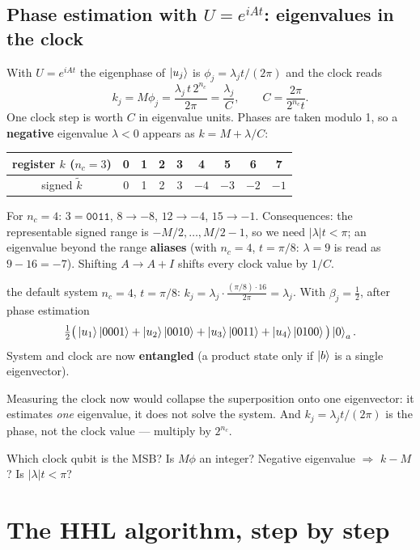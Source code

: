 \documentclass[11pt,a4paper,openany]{book}
\newcounter{wex}[chapter]
\begin{document}
\subsection{Phase estimation with $U = e^{iAt}$: eigenvalues in the clock}
With $U = e^{iAt}$ the eigenphase of $\ket{u_j}$ is $\phi_j = \lambda_jt/(2\pi)$ and the clock reads
\[ k_j = M\phi_j = \frac{\lambda_j\,t\,2^{n_c}}{2\pi} = \frac{\lambda_j}{C},\qquad C = \frac{2\pi}{2^{n_c}t}. \]
One clock step is worth $C$ in eigenvalue units. Phases are taken modulo 1, so a \textbf{negative} eigenvalue $\lambda < 0$ appears as $k = M + \lambda/C$:
\begin{center}\small
\begin{tabular}{c|cccccccc}
register $k$ ($n_c = 3$) & 0 & 1 & 2 & 3 & 4 & 5 & 6 & 7\\ \hline
signed $\tilde k$ & 0 & 1 & 2 & 3 & $-4$ & $-3$ & $-2$ & $-1$
\end{tabular}
\end{center}
For $n_c = 4$: $3 = \texttt{0011}$, $8 \to -8$, $12 \to -4$, $15 \to -1$. Consequences: the representable signed range is $-M/2, \dots, M/2 - 1$, so we need $|\lambda|t < \pi$;
an eigenvalue beyond the range \textbf{aliases} (with $n_c = 4$, $t = \pi/8$: $\lambda = 9$ is read as $9 - 16 = -7$). Shifting $A \to A + I$ shifts every clock value by $1/C$.
\begin{wexample}{the default system}
$n_c = 4$, $t = \pi/8$: $k_j = \lambda_j\cdot\frac{(\pi/8)\cdot16}{2\pi} = \lambda_j$. With $\beta_j = \frac12$, after phase estimation
\[ \tfrac12\big(\ket{u_1}\ket{0001} + \ket{u_2}\ket{0010} + \ket{u_3}\ket{0011} + \ket{u_4}\ket{0100}\big)\ket0_a. \]
System and clock are now \textbf{entangled} (a product state only if $\ket b$ is a single eigenvector).
\end{wexample}
\begin{trap}
Measuring the clock now would collapse the superposition onto one eigenvector: it estimates \emph{one} eigenvalue, it does not solve the system. And
$k_j = \lambda_jt/(2\pi)$ is the phase, not the clock value --- multiply by $2^{n_c}$.
\end{trap}
\begin{checklist}
Which clock qubit is the MSB? Is $M\phi$ an integer? Negative eigenvalue $\Rightarrow$ $k - M$? Is $|\lambda|t < \pi$?
\end{checklist}

\section{The HHL algorithm, step by step}
\end{document}
